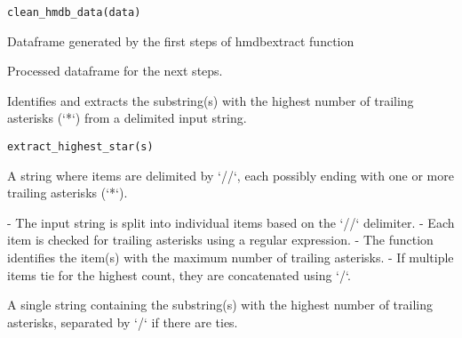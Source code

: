 \documentclass[a4paper]{book}
\begin{document}
%
\begin{Usage}
\begin{verbatim}
clean_hmdb_data(data)
\end{verbatim}
\end{Usage}
%
\begin{Arguments}
\begin{ldescription}
\item[\code{data}] Dataframe generated by the first steps of hmdbextract function
\end{ldescription}
\end{Arguments}
%
\begin{Value}
Processed dataframe for the next steps.
\end{Value}
%
\begin{Description}
Identifies and extracts the substring(s) with the highest number
of trailing asterisks (`*`) from a delimited input string.
\end{Description}
%
\begin{Usage}
\begin{verbatim}
extract_highest_star(s)
\end{verbatim}
\end{Usage}
%
\begin{Arguments}
\begin{ldescription}
\item[\code{s}] A string where items are delimited by `//`, each possibly ending with
one or more trailing asterisks (`*`).
\end{ldescription}
\end{Arguments}
%
\begin{Details}
- The input string is split into individual items based on the `//` delimiter.
- Each item is checked for trailing asterisks using a regular expression.
- The function identifies the item(s) with the maximum number of trailing asterisks.
- If multiple items tie for the highest count, they are concatenated using `/`.
\end{Details}
%
\begin{Value}
A single string containing the substring(s) with the highest number
of trailing asterisks, separated by `/` if there are ties.
\end{Value}
\end{document}
